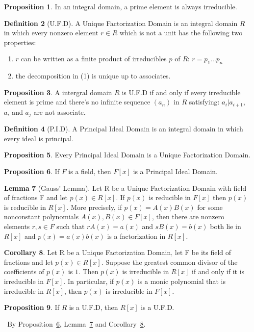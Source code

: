 \documentclass[a4paper,12pt]{article}
\newenvironment{prooff}{{\noindent\it\textcolor{cyan!40!black}{Proof}:}\,}{\par}
\theoremstyle{definition}
\newtheorem{defn}{Definition}[subsection]
\newtheorem{coro}[defn]{Corollary}
\newtheorem{lem}[defn]{Lemma}
\newtheorem{prop}[defn]{Proposition}
\begin{document}
\begin{prop}
    In an integral domain, a prime element is always irreducible.
\end{prop}
\begin{defn}[U.F.D]
    A Unique Factorization Domain is an integral domain $R$ in which
    every nonzero element $r\in R$ which is not a unit has the following two properties:
    \begin{enumerate}
        \item $r$ can be written as a finite product of irreducibles $p$ of $R$: $r = p_1\dots p_n$
        \item the decomposition in (1) is unique up to associates.
    \end{enumerate}
\end{defn}
\begin{prop}
    A intergral domain $R$ is U.F.D if and only if every irreducible element is prime and there's no
    infinite sequence $(a_n)$ in $R$ satisfying: $a_i|a_{i+1}$, $a_i$ and $a_j$ are not associate.
\end{prop}
\begin{defn}[P.I.D]
    A Principal Ideal Domain is an integral domain in which every
    ideal is principal.
\end{defn}
\begin{prop}
    Every Principal Ideal Domain is a Unique Factorization Domain.
\end{prop}
\begin{prop}
    If $F$ is a field, then $F[x]$ is a Principal Ideal Domain.
    \label{F[x] is PID}
\end{prop}
\begin{lem}[Gauss' Lemma]
    Let R be a Unique Factorization Domain with field of
    fractions F and let $p(x) \in  R[x]$. If $p(x)$ is reducible in $F[x]$ then $p(x)$ is reducible
    in $R[x]$. More precisely, if $p(x) = A(x)B(x)$ for some nonconstant polynomials
    $A(x),B(x) \in F[x]$, then there are nonzero elements $r,s\in F$ such that $r A(x) = a(x)$
    and $sB(x) = b(x)$ both lie in $R[x]$ and $p(x) = a(x)b(x)$ is a factorization in $R[x]$.
    \label{lemma:Gauss's Lemma}
\end{lem}
\begin{coro}
    Let R be a Unique Factorization Domain, let F be its field of fractions and
    let $p(x) \in R[x]$. Suppose the greatest common divisor of the coefficients of $p(x)$ is $1$.
    Then $p(x)$ is irreducible in $R[x]$ if and only if it is irreducible in $F[x]$. In particular, if
    $p(x)$ is a monic polynomial that is irreducible in $R[x]$, then $p(x)$ is irreducible in $F[x]$.
    \label{corollary:irreducible and gcd}
\end{coro}
\begin{prop}
    If $R$ is a U.F.D, then $R[x]$ is a U.F.D.
\end{prop}
\begin{prooff}
    By Proposition~\ref{F[x] is PID}, Lemma~\ref{lemma:Gauss's Lemma} and Corollary~\ref{corollary:irreducible and gcd}.
\end{prooff}
\end{document}
